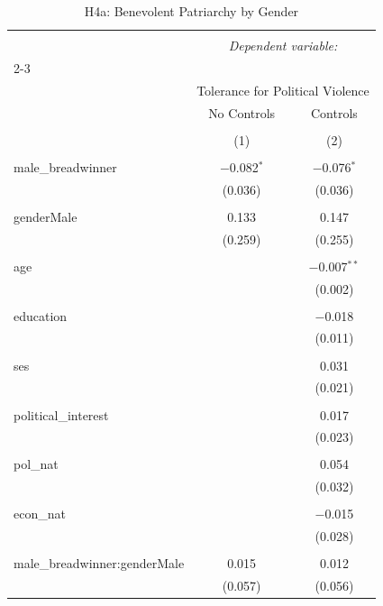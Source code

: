 
\begin{table}[!htbp] \centering 
  \caption{H4a: Benevolent Patriarchy by Gender} 
  \label{} 
\begin{tabular}{@{\extracolsep{5pt}}lcc} 
\\[-1.8ex]\hline 
\hline \\[-1.8ex] 
 & \multicolumn{2}{c}{\textit{Dependent variable:}} \\ 
\cline{2-3} 
\\[-1.8ex] & \multicolumn{2}{c}{Tolerance for Political Violence} \\ 
 & No Controls & Controls \\ 
\\[-1.8ex] & (1) & (2)\\ 
\hline \\[-1.8ex] 
 male\_breadwinner & $-$0.082$^{*}$ & $-$0.076$^{*}$ \\ 
  & (0.036) & (0.036) \\ 
  & & \\ 
 genderMale & 0.133 & 0.147 \\ 
  & (0.259) & (0.255) \\ 
  & & \\ 
 age &  & $-$0.007$^{**}$ \\ 
  &  & (0.002) \\ 
  & & \\ 
 education &  & $-$0.018 \\ 
  &  & (0.011) \\ 
  & & \\ 
 ses &  & 0.031 \\ 
  &  & (0.021) \\ 
  & & \\ 
 political\_interest &  & 0.017 \\ 
  &  & (0.023) \\ 
  & & \\ 
 pol\_nat &  & 0.054 \\ 
  &  & (0.032) \\ 
  & & \\ 
 econ\_nat &  & $-$0.015 \\ 
  &  & (0.028) \\ 
  & & \\ 
 male\_breadwinner:genderMale & 0.015 & 0.012 \\ 
  & (0.057) & (0.056) \\ 

\end{tabular}
\end{table}
